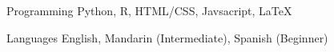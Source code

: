 

\begin{cvskills}

  \cvskill
    {Programming} %
    {Python, R, HTML/CSS, Javsacript, LaTeX} %


  \cvskill
    {Languages} %
    {English, Mandarin (Intermediate), Spanish (Beginner)} %

\end{cvskills}
